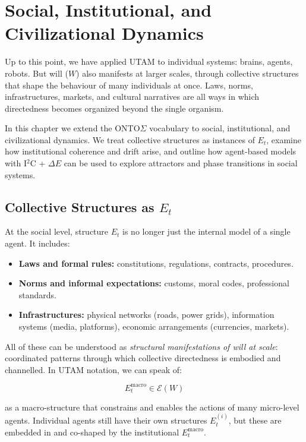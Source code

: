 \documentclass[12pt,a4paper]{report}
\newcommand{\Will}{W}
\begin{document}
\chapter{Social, Institutional, and Civilizational Dynamics}

Up to this point, we have applied UTAM to individual systems: brains, agents, robots. But will (\(\Will\)) also manifests at larger scales, through collective structures that shape the behaviour of many individuals at once. Laws, norms, infrastructures, markets, and cultural narratives are all ways in which directedness becomes organized beyond the single organism.

In this chapter we extend the ONTO$\Sigma$ vocabulary to social, institutional, and civilizational dynamics. We treat collective structures as instances of \(E_t\), examine how institutional coherence and drift arise, and outline how agent-based models with I$^2$C + \(\Delta E\) can be used to explore attractors and phase transitions in social systems.

\section{Collective Structures as \texorpdfstring{$E_t$}{E\_t}}

At the social level, structure \(E_t\) is no longer just the internal model of a single agent. It includes:

\begin{itemize}[leftmargin=2em]
    \item \textbf{Laws and formal rules:} constitutions, regulations, contracts, procedures.
    \item \textbf{Norms and informal expectations:} customs, moral codes, professional standards.
    \item \textbf{Infrastructures:} physical networks (roads, power grids), information systems (media, platforms), economic arrangements (currencies, markets).
\end{itemize}

All of these can be understood as \emph{structural manifestations of will at scale}: coordinated patterns through which collective directedness is embodied and channelled. In UTAM notation, we can speak of:

\[
    E_t^{\mathrm{macro}} \in \mathcal{E}(\Will)
\]

as a macro-structure that constrains and enables the actions of many micro-level agents. Individual agents still have their own structures \(E_t^{(i)}\), but these are embedded in and co-shaped by the institutional \(E_t^{\mathrm{macro}}\).
\end{document}
